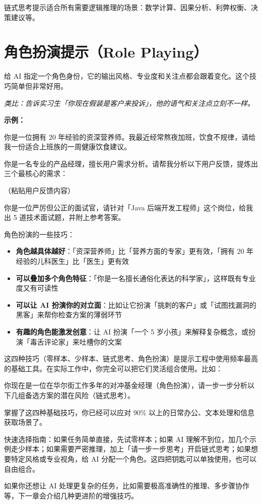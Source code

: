 链式思考提示适合所有需要逻辑推理的场景：数学计算、因果分析、利弊权衡、决策建议等。

\section{角色扮演提示（Role Playing）}
\label{sec:role-playing}

给 AI 指定一个角色身份，它的输出风格、专业度和关注点都会跟着变化。这个技巧简单但非常好用。

\textit{类比：告诉实习生「你现在假装是客户来投诉」，他的语气和关注点立刻不一样。}

\textbf{示例：}

\begin{promptbox}
你是一位拥有 20 年经验的资深营养师。我最近经常熬夜加班，饮食不规律，请给我一份适合上班族的一周健康饮食建议。
\end{promptbox}

\begin{promptbox}
你是一名专业的产品经理，擅长用户需求分析。请帮我分析以下用户反馈，提炼出三个最核心的需求：

（粘贴用户反馈内容）
\end{promptbox}

\begin{promptbox}
你是一位严厉但公正的面试官，请针对「Java 后端开发工程师」这个岗位，给我出 5 道技术面试题，并附上参考答案。
\end{promptbox}

角色扮演的一些技巧：

\begin{itemize}
  \item \textbf{角色越具体越好}：「资深营养师」比「营养方面的专家」更有效，「拥有 20 年经验的儿科医生」比「医生」更有效
  \item \textbf{可以叠加多个角色特征}：「你是一名擅长通俗化表达的科学家」，这样既有专业度又有可读性
  \item \textbf{可以让 AI 扮演你的对立面}：比如让它扮演「挑刺的客户」或「试图找漏洞的黑客」来帮你检查方案的薄弱环节
  \item \textbf{有趣的角色能激发创意}：让 AI 扮演「一个 5 岁小孩」来解释复杂概念，或扮演「毒舌评论家」来吐槽你的文案
\end{itemize}

这四种技巧（零样本、少样本、链式思考、角色扮演）是提示工程中使用频率最高的基础工具。在实际工作中，你完全可以把它们灵活组合使用。比如：

\begin{promptbox}
你现在是一位在华尔街工作多年的对冲基金经理（角色扮演），请一步一步分析以下几组备选方案的潜在风险（链式思考）。
\end{promptbox}

掌握了这四种基础技巧，你已经可以应对 90\% 以上的日常办公、文本处理和信息获取场景了。

\begin{tipbox}
快速选择指南：如果任务简单直接，先试零样本；如果 AI 理解不到位，加几个示例走少样本；如果需要严密推理，加上「请一步一步思考」开启链式思考；如果想要特定风格或专业视角，给 AI 分配一个角色。这四把钥匙可以单独使用，也可以自由组合。
\end{tipbox}

如果你还想让 AI 处理更复杂的任务，比如需要极高准确性的推理、多步骤协作等，下一章会介绍几种更进阶的增强技巧。
